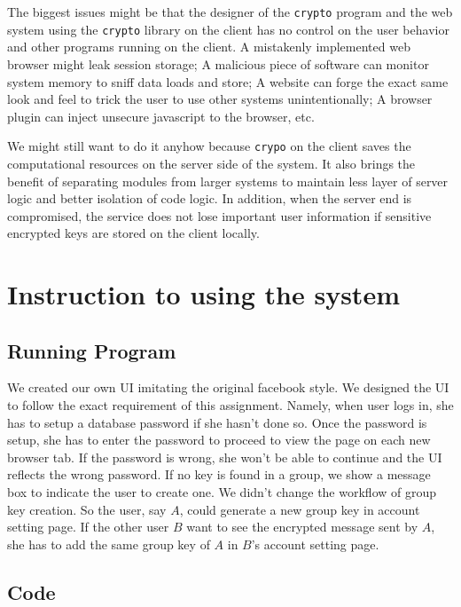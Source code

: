 The biggest issues might be that the designer of the \texttt{crypto} program and the web system using the \texttt{crypto} library on the client has no control on the user behavior and other programs running on the client. A mistakenly implemented web browser might leak session storage; A malicious piece of software can monitor system memory to sniff data loads and store; A website can forge the exact same look and feel to trick the user to use other systems unintentionally; A browser plugin can inject unsecure javascript to the browser, etc.

We might still want to do it anyhow because \texttt{crypo} on the client saves the computational resources on the server side of the system. It also brings the benefit of separating modules from larger systems to maintain less layer of server logic and better isolation of code logic. In addition, when the server end is compromised, the service does not lose important user information if sensitive encrypted keys are stored on the client locally.

\section{Instruction to using the system}

\subsection{Running Program}

We created our own UI imitating the original facebook style. We designed the UI to follow the exact requirement of this assignment. Namely, when user logs in, she has to setup a database password if she hasn't done so. Once the password is setup, she has to enter the password to proceed to view the page on each new browser tab. If the password is wrong, she won't be able to continue and the UI reflects the wrong password. If no key is found in a group, we show a message box to indicate the user to create one. 
We didn't change the workflow of group key creation. So the user, say $A$, could generate a new group key in account setting page. If the other user $B$ want to see the encrypted message sent by $A$, she has to add the same group key of $A$ in $B$'s account setting page.

\subsection{Code}

